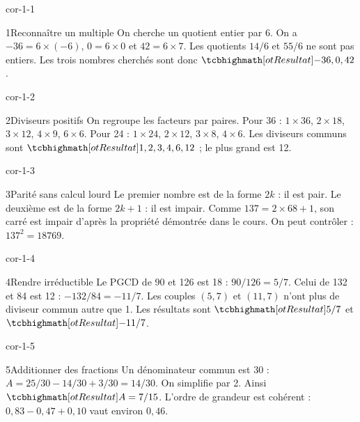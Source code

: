 \clearpage\pagestyle{otMain}\fontsize{11}{15}\selectfont
{}
\begin{blocLivre}{cor-1-1}
\begin{corrige}{1}{Reconnaître un multiple}
On cherche un quotient entier par 6. On a $-36=6\times(-6)$, $0=6\times0$ et $42=6\times7$. Les quotients $14/6$ et $55/6$ ne sont pas entiers. Les trois nombres cherchés sont donc $\res{-36,0,42}$.
\end{corrige}
\end{blocLivre}
\begin{blocLivre}{cor-1-2}
\begin{corrige}{2}{Diviseurs positifs}
On regroupe les facteurs par paires. Pour 36 : $1\times36$, $2\times18$, $3\times12$, $4\times9$, $6\times6$. Pour 24 : $1\times24$, $2\times12$, $3\times8$, $4\times6$. Les diviseurs communs sont $\res{1,2,3,4,6,12}$ ; le plus grand est 12.
\end{corrige}
\end{blocLivre}
\begin{blocLivre}{cor-1-3}
\begin{corrige}{3}{Parité sans calcul lourd}
Le premier nombre est de la forme $2k$ : il est pair. Le deuxième est de la forme $2k+1$ : il est impair. Comme $137=2\times68+1$, son carré est impair d’après la propriété démontrée dans le cours. On peut contrôler : $137^2=18769$.
\end{corrige}
\end{blocLivre}
\begin{blocLivre}{cor-1-4}
\begin{corrige}{4}{Rendre irréductible}
Le PGCD de 90 et 126 est 18 : $90/126=5/7$. Celui de 132 et 84 est 12 : $-132/84=-11/7$. Les couples $(5,7)$ et $(11,7)$ n’ont plus de diviseur commun autre que 1. Les résultats sont $\res{5/7}$ et $\res{-11/7}$.
\end{corrige}
\end{blocLivre}
\begin{blocLivre}{cor-1-5}
\begin{corrige}{5}{Additionner des fractions}
Un dénominateur commun est 30 : $A=25/30-14/30+3/30=14/30$. On simplifie par 2. Ainsi $\res{A=7/15}$. L’ordre de grandeur est cohérent : $0{,}83-0{,}47+0{,}10$ vaut environ $0{,}46$.
\end{corrige}
\end{blocLivre}
